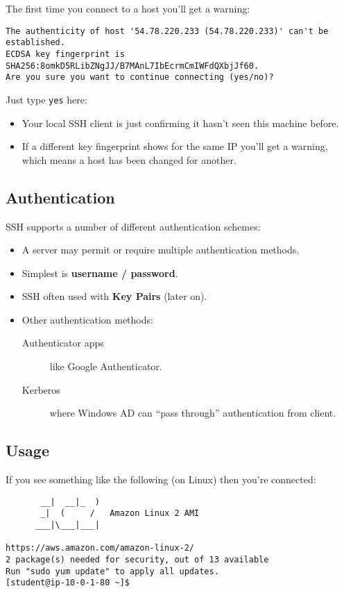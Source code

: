 \documentclass[slides]{pgnotes}
\begin{document}
The first time you connect to a host you'll get a warning:

\begin{verbatim}
The authenticity of host '54.78.220.233 (54.78.220.233)' can't be established.
ECDSA key fingerprint is SHA256:8omkD5RLibZNgJJ/B7MAnL7IbEcrmCmIWFdQXbjJf60.
Are you sure you want to continue connecting (yes/no)?
\end{verbatim}

Just type \texttt{yes} here:
\begin{itemize}
\item Your local SSH client is just confirming it hasn't seen this machine before.
\item If a different key fingerprint shows for the same IP you'll get a warning, which means a host has been changed for another.
\end{itemize}


\subsection{Authentication}

SSH supports a number of different authentication schemes:
\begin{itemize}
\item A server may permit or require multiple authentication methods.
\item Simplest is \textbf{username / password}.
\item SSH often used with \textbf{Key Pairs} (later on).
\item Other authentication methods:
  \begin{description}
  \item[Authenticator apps] like Google Authenticator.
  \item[Kerberos] where Windows AD can ``pass through'' authentication from client.
  \end{description}
\end{itemize}

\subsection{Usage}

If you see something like the following (on Linux) then you're connected:

\begin{verbatim}
       __|  __|_  )
       _|  (     /   Amazon Linux 2 AMI
      ___|\___|___|

https://aws.amazon.com/amazon-linux-2/
2 package(s) needed for security, out of 13 available
Run "sudo yum update" to apply all updates.
[student@ip-10-0-1-80 ~]$
\end{verbatim}
\end{document}
